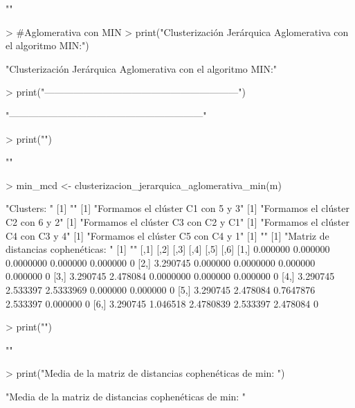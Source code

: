\documentclass[parskip=full]{scrartcl}
\begin{document}
\begin{Schunk}
\begin{Soutput}
[1] ""
\end{Soutput}
\begin{Sinput}
> #Aglomerativa con MIN
> print("Clusterización Jerárquica Aglomerativa con el algoritmo MIN:")
\end{Sinput}
\begin{Soutput}
[1] "Clusterización Jerárquica Aglomerativa con el algoritmo MIN:"
\end{Soutput}
\begin{Sinput}
> print("------------------------------------------------------------")
\end{Sinput}
\begin{Soutput}
[1] "------------------------------------------------------------"
\end{Soutput}
\begin{Sinput}
> print("")
\end{Sinput}
\begin{Soutput}
[1] ""
\end{Soutput}
\begin{Sinput}
> min_mcd <- clusterizacion_jerarquica_aglomerativa_min(m)
\end{Sinput}
\begin{Soutput}
[1] "Clusters: "
[1] ""
[1] "Formamos el clúster C1 con 5 y 3"
[1] "Formamos el clúster C2 con 6 y 2"
[1] "Formamos el clúster C3 con C2 y C1"
[1] "Formamos el clúster C4 con C3 y 4"
[1] "Formamos el clúster C5 con C4 y 1"
[1] ""
[1] "Matriz de distancias cophenéticas: "
[1] ""
         [,1]     [,2]      [,3]     [,4]     [,5] [,6]
[1,] 0.000000 0.000000 0.0000000 0.000000 0.000000    0
[2,] 3.290745 0.000000 0.0000000 0.000000 0.000000    0
[3,] 3.290745 2.478084 0.0000000 0.000000 0.000000    0
[4,] 3.290745 2.533397 2.5333969 0.000000 0.000000    0
[5,] 3.290745 2.478084 0.7647876 2.533397 0.000000    0
[6,] 3.290745 1.046518 2.4780839 2.533397 2.478084    0
\end{Soutput}
\begin{Sinput}
> print("")
\end{Sinput}
\begin{Soutput}
[1] ""
\end{Soutput}
\begin{Sinput}
> print("Media de la matriz de distancias cophenéticas de min: ")
\end{Sinput}
\begin{Soutput}
[1] "Media de la matriz de distancias cophenéticas de min: "
\end{Soutput}
\begin{Sinput}

\end{Sinput}
\end{Schunk}
\end{document}
